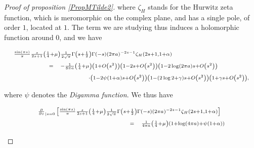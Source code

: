 \documentclass{jams-l}
\theoremstyle{definition}
\theoremstyle{remark}
\numberwithin{equation}{section}
\begin{document}
\begin{proof}[Proof of proposition \ref{PropMTilde2}]
                        \noindent where $\zeta_H$ stands for the Hurwitz zeta function, which is meromorphic on the complex plane, and has a single pole, of order $1$, located at $1$. The term we are studying thus induces a holomorphic function around $0$, and we have
                        
                        \[ \begin{array}{lll}
                                \multicolumn{3}{l}{\scriptstyle \frac{\sin \left( \pi s \right)}{\pi} \frac{s}{2s+1} \left( \frac{1}{4} + \mu \right) \frac{1}{2 \sqrt{\pi}} \Gamma \left( s + \frac{1}{2} \right) \Gamma \left( -s \right) \left( 2 \pi a \right)^{-2s-1} \zeta_H \left( 2s+1, 1+\alpha \right)} \\[0.5em]
                                
                                \qquad \qquad & \scriptstyle = & \scriptstyle - \frac{1}{8 \pi a} \left( \frac{1}{4} + \mu \right) \left( 1 + O \left( s^2 \right) \right) \left( 1 - 2s + O \left( s^2 \right) \right) \left( 1 - 2 \log \left( 2 \pi a \right) s + O \left( s^2 \right) \right) \\[0.5em]
                                
                                && \qquad \qquad \scriptstyle \cdot \left( 1 - 2 \psi \left( 1 + \alpha \right) s + O \left( s^2 \right) \right) \left( 1 - \left( 2 \log 2 + \gamma \right) s + O \left( s^2 \right) \right) \left( 1 + \gamma s + O \left( s^2 \right) \right),
                            \end{array} \]
                        
                        \noindent where $\psi$ denotes the \textit{Digamma function}. We thus have
                        
                        \[ \begin{array}{lll}
                                \multicolumn{3}{l}{\scriptstyle \frac{\partial}{\partial s}_{\left \vert s = 0 \right.} \left[ \frac{\sin \left( \pi s \right)}{\pi} \frac{s}{2s+1} \left( \frac{1}{4} + \mu \right) \frac{1}{2 \sqrt{\pi}} \Gamma \left( s + \frac{1}{2} \right) \Gamma \left( -s \right) \left( 2 \pi a \right)^{-2s-1} \zeta_H \left( 2s+1, 1+\alpha \right) \right]} \\[0.5em]
                                
                                \qquad \qquad \qquad \qquad \qquad \qquad & \scriptstyle = & \scriptstyle \frac{1}{4 \pi a} \left( \frac{1}{4} + \mu \right) \left( 1 + \log \left( 4 \pi a \right) + \psi \left( 1 + \alpha \right) \right) \\[0.5em]
                                

\end{array}\]
\end{proof}
\end{document}
